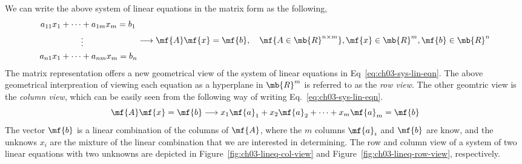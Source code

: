 We can write the above system of linear equations in the matrix form as the following,
\begin{equation}
    \begin{split}
        a_{11}x_1 + \cdots& + a_{1m}x_m = b_1\\
        &\vdots\\
        a_{n1}x_1 + \cdots& + a_{nm}x_m = b_n
    \end{split} \longrightarrow \mf{A}\mf{x} = \mf{b}, \quad \mf{A \in \mb{R}^{n \times m}}, \mf{x} \in \mb{R}^m, \mf{b} \in \mb{R}^n
\end{equation}
The matrix representation offers a new geometrical view of the system of linear equations in Eq~\ref{eq:ch03-sys-lin-eqn}. The above geometrical interpreation of viewing each equation as a hyperplane in $\mb{R}^m$ is referred to as the \textit{row view}. The other geomtric view is the \textit{column view}, which can be easily seen from the following way of writing Eq.~\ref{eq:ch03-sys-lin-eqn}.
\begin{equation}
    \mf{A}\mf{x} = \mf{b} \longrightarrow x_1\mf{a}_1 + x_2\mf{a}_2 + \cdots + x_m \mf{a}_m = \mf{b}
\end{equation}
The vector $\mf{b}$ is a linear combination of the columns of $\mf{A}$, where the $m$ columns $\mf{a}_i$ and $\mf{b}$ are know, and the unknows $x_i$ are the mixture of the linear combination that we are interested in determining. The row and column view of a system of two linear equations with two unknowns are depicted in Figure~\ref{fig:ch03-lineq-col-view} and Figure~\ref{fig:ch03-lineq-row-view}, respectively.

